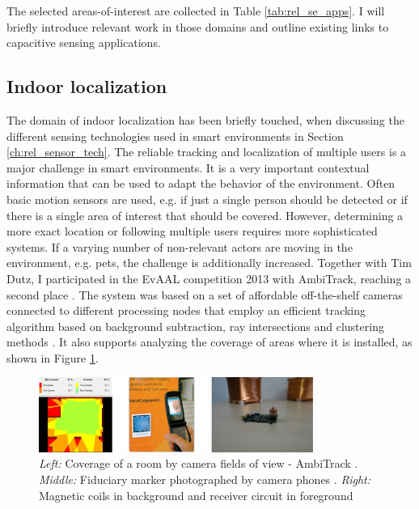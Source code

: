 The selected areas-of-interest are collected in Table \ref{tab:rel_se_apps}. I will briefly introduce relevant work in those domains and outline existing links to capacitive sensing applications. 

\subsection{Indoor localization}
The domain of indoor localization has been briefly touched, when discussing the different sensing technologies used in smart environments in Section \ref{ch:rel_sensor_tech}. The reliable tracking and localization of multiple users is a major challenge in smart environments. It is a very important contextual information that can be used to adapt the behavior of the environment. Often basic motion sensors are used, e.g. if just a single person should be detected or if there is a single area of interest that should be covered. However, determining a more exact location or following multiple users requires more sophisticated systems. If a varying number of non-relevant actors are moving in the environment, e.g. pets, the challenge is additionally increased. Together with Tim Dutz, I participated in the EvAAL competition 2013 with AmbiTrack, reaching a second place \cite{braun2013ambitrack}. The system was based on a set of affordable off-the-shelf cameras connected to different processing nodes that employ an efficient tracking algorithm based on background subtraction, ray intersections and clustering methods \cite{Braun2013MarkerFree}. It also supports analyzing the coverage of areas where it is installed, as shown in Figure \ref{fig:rel_app_indoor}.

\begin{figure}[ht]
\centering
\includegraphics[width=0.8\textwidth]{images/rel_app_indoor}
\caption{\emph{Left:} Coverage of a room by camera fields of view - AmbiTrack \cite{Braun2013MarkerFree}. \emph{Middle:} Fiduciary marker photographed by camera phones \cite{mulloni2009indoor}. \emph{Right:} Magnetic coils in background and receiver circuit in foreground \cite{pirkl2013indoor}}
\label{fig:rel_app_indoor}
\end{figure}	

